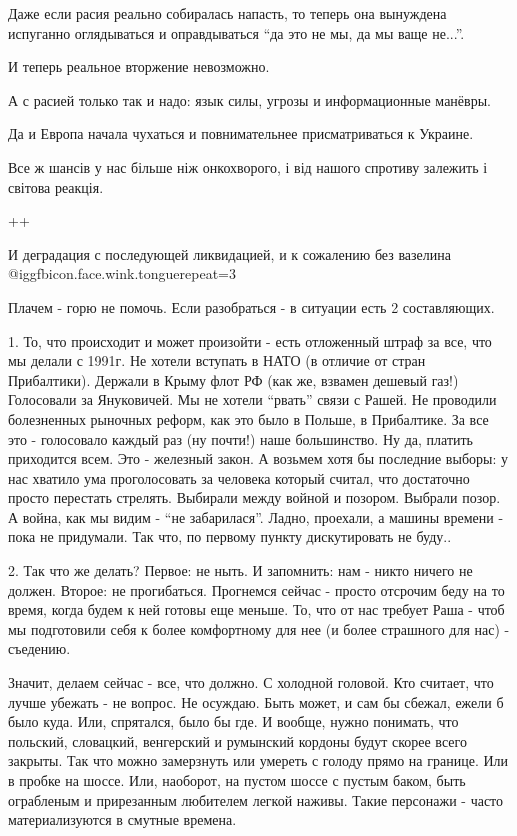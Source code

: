 \begin{itemize}
Даже если расия реально собиралась напасть, то теперь она вынуждена испуганно
оглядываться и оправдываться \enquote{да это не мы, да мы ваще не...}.

И теперь реальное вторжение невозможно.

А с расией только так и надо: язык силы, угрозы и информационные манёвры.

Да и Европа начала чухаться и повнимательнее присматриваться к Украине.


Все ж шансів у нас більше ніж онкохворого, і від нашого спротиву залежить і
світова реакція.

++


И деградация с последующей ликвидацией, и к сожалению без вазелина
@igg{fbicon.face.wink.tongue}{repeat=3} 


Плачем - горю не помочь. Если разобраться - в ситуации есть 2 составляющих.

1. То, что происходит и может произойти - есть отложенный штраф за все, что мы
делали с 1991г. Не хотели вступать в НАТО (в отличие от стран Прибалтики).
Держали в Крыму флот РФ (как же, взвамен дешевый газ!) Голосовали за
Януковичей. Мы не хотели \enquote{рвать} связи с Рашей. Не проводили
болезненных рыночных реформ, как это было в Польше, в Прибалтике. За все это -
голосовало каждый раз (ну почти!) наше большинство. Ну да, платить приходится
всем. Это - железный закон. А возьмем хотя бы последние выборы: у нас хватило
ума проголосовать за человека который считал, что достаточно просто перестать
стрелять. Выбирали между войной и позором. Выбрали позор. А война, как мы видим
- \enquote{не забарилася}. Ладно, проехали, а машины времени - пока не
придумали. Так что, по первому пункту дискутировать не буду..

2. Так что же делать? Первое: не ныть. И запомнить: нам - никто ничего не
должен. Второе: не прогибаться. Прогнемся сейчас - просто отсрочим беду на то
время, когда будем к ней готовы еще меньше. То, что от нас требует Раша - чтоб
мы подготовили себя к более комфортному для нее (и более страшного для нас) -
съедению.

Значит, делаем сейчас - все, что должно. С холодной головой. Кто считает, что
лучше убежать - не вопрос. Не осуждаю. Быть может, и сам бы сбежал, ежели б
было куда. Или, спрятался, было бы где. И вообще, нужно понимать, что польский,
словацкий, венгерский и румынский кордоны будут скорее всего закрыты. Так что
можно замерзнуть или умереть с голоду прямо на границе. Или в пробке на шоссе.
Или, наоборот, на пустом шоссе с пустым баком, быть ограбленым и прирезанным
любителем легкой наживы. Такие персонажи - часто материализуются в смутные
времена.


\end{itemize}
